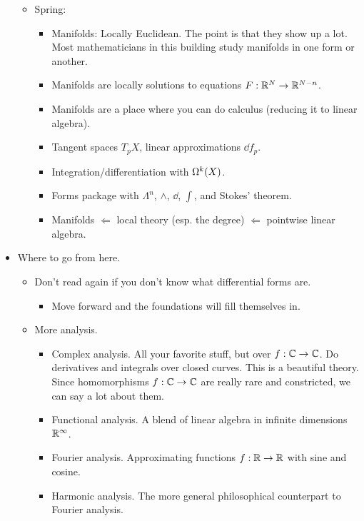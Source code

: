 \documentclass[../notes.tex]{subfiles}
\begin{document}
\begin{itemize}
\begin{itemize}
\begin{itemize}
        \end{itemize}
        \item Spring:
        \begin{itemize}
            \item Manifolds: Locally Euclidean. The point is that they show up a lot. Most mathematicians in this building study manifolds in one form or another.
            \item Manifolds are locally solutions to equations $F:\R^N\to\R^{N-n}$.
            \item Manifolds are a place where you can do calculus (reducing it to linear algebra).
            \item Tangent spaces $T_pX$, linear approximations $\dd f_p$.
            \item Integration/differentiation with $\ome[k]{X}$.
            \item Forms package with $\Lambda^n$, $\wedge$, $\dd$, $\int$, and Stokes' theorem.
            \item Manifolds $\Leftarrow$ local theory (esp. the degree) $\Leftarrow$ pointwise linear algebra.
        \end{itemize}
    \end{itemize}
    \item Where to go from here.
    \begin{itemize}
        \item Don't read \textcite{bib:DifferentialForms} again if you don't know what differential forms are.
        \begin{itemize}
            \item Move forward and the foundations will fill themselves in.
        \end{itemize}
        \item More analysis.
        \begin{itemize}
            \item Complex analysis. All your favorite stuff, but over $f:\C\to\C$. Do derivatives and integrals over closed curves. This is a beautiful theory. Since homomorphisms $f:\C\to\C$ are really rare and constricted, we can say a lot about them.
            \item Functional analysis. A blend of linear algebra in infinite dimensions $\R^\infty$.
            \item Fourier analysis. Approximating functions $f:\R\to\R$ with sine and cosine.
            \item Harmonic analysis. The more general philosophical counterpart to Fourier analysis.

\end{itemize}
\end{itemize}
\end{itemize}
\end{document}

